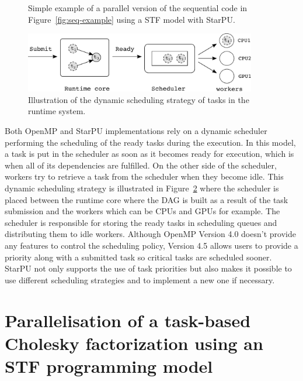 \documentclass{article}
\newcommand{\starpu}{{StarPU}\xspace}
\newcommand{\openmp}{OpenMP\xspace}
\newcommand{\lsection}[1]{\section{#1} \setcounter{equation}{0} \setcounter{figure}{0} \setcounter{table}{0} \label{#1}}
\begin{document}
\begin{figure}[!h]
  \centering 
  \caption{\label{fig:stf-starpu-example}Simple example of a parallel version
    of the sequential code in Figure~\ref{fig:seq-example} using a STF
    model with \starpu.}
\end{figure}

\begin{figure}[!h]
    \centering
    \includegraphics[width=0.9\textwidth]{figures/scheduler}
    \caption{\label{fig:scheduler} Illustration of the dynamic
      scheduling strategy of tasks in the runtime system.}
\end{figure}

Both \openmp and \starpu implementations rely on a dynamic scheduler
performing the scheduling of the ready tasks during the execution. In
this model, a task is put in the scheduler as soon as it becomes ready
for execution, which is when all of its dependencies are
fulfilled. On the other side of the scheduler, workers try to retrieve
a task from the scheduler when they become idle. This dynamic
scheduling strategy is illustrated in Figure~\ref{fig:scheduler} where
the scheduler is placed between the runtime core where the DAG is
built as a result of the task submission and the workers which can be
CPUs and GPUs for example. The scheduler is responsible for storing
the ready tasks in scheduling queues and distributing them to idle
workers. Although \openmp Version 4.0 doesn't provide any features to
control the scheduling policy, Version 4.5 allows users to provide
a priority along with a submitted task so critical tasks are scheduled sooner.
\starpu not
only supports the use of task priorities but also makes it possible
to use different scheduling strategies and to implement a new one if
necessary.

\lsection{Parallelisation of a task-based Cholesky factorization using an STF programming model}
\label{sec:spllt-stf}

\end{document}
